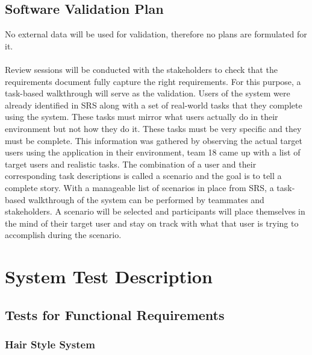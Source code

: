 \documentclass[12pt, titlepage]{article}
\begin{document}
\newpage

\subsection{Software Validation Plan}

No external data will be used for validation, therefore no plans are formulated for it.\\
\\
\noindent Review sessions will be conducted with the stakeholders to check that the requirements document fully capture the right requirements. For this purpose, a task-based walkthrough will serve as the validation. Users of the system were already identified in SRS along with a set of real-world tasks that they complete using the system. These tasks must mirror what users actually do in their environment but not how they do it. These tasks must be very specific and they must be complete. This information was gathered by observing the actual target users using the application in their environment, team 18 came up with a list of target users and realistic tasks. The combination of a user and their corresponding task descriptions is called a scenario and the goal is to tell a complete story.
With a manageable list of scenarios in place from SRS, a task-based walkthrough of the system can be performed by teammates and stakeholders. A scenario will be selected and participants will
place themselves in the mind of their target user and stay on track with what that user is trying to accomplish during the scenario. 


\section{System Test Description}
	
\subsection{Tests for Functional Requirements}

\subsubsection{Hair Style System}
		
\end{document}
